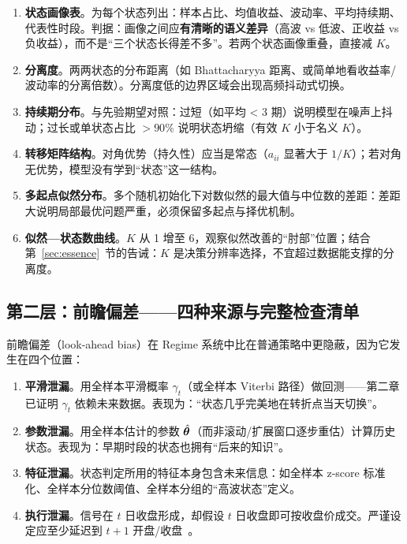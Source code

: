 \begin{enumerate}[itemsep=3pt]
\item \textbf{状态画像表}。为每个状态列出：样本占比、均值收益、波动率、平均持续期、代表性时段。判据：画像之间应\textbf{有清晰的语义差异}（高波 vs 低波、正收益 vs 负收益），而不是“三个状态长得差不多”。若两个状态画像重叠，直接减 $K$。
\item \textbf{分离度}。两两状态的分布距离（如 Bhattacharyya 距离、或简单地看收益率/波动率的分离倍数）。分离度低的边界区域会出现高频抖动式切换。
\item \textbf{持续期分布}。与先验期望对照：过短（如平均 < 3 期）说明模型在噪声上抖动；过长或单状态占比 $> 90\%$ 说明状态坍缩（有效 $K$ 小于名义 $K$）。
\item \textbf{转移矩阵结构}。对角优势（持久性）应当是常态（$a_{ii}$ 显著大于 $1/K$）；若对角无优势，模型没有学到“状态”这一结构。
\item \textbf{多起点似然分布}。多个随机初始化下对数似然的最大值与中位数的差距：差距大说明局部最优问题严重，必须保留多起点与择优机制。
\item \textbf{似然—状态数曲线}。$K$ 从 1 增至 6，观察似然改善的“肘部”位置；结合第~\ref{sec:essence}~节的告诫：$K$ 是决策分辨率选择，不宜超过数据能支撑的分离度。
\end{enumerate}

\subsection{第二层：前瞻偏差——四种来源与完整检查清单}

前瞻偏差（look-ahead bias）在 Regime 系统中比在普通策略中更隐蔽，因为它发生在四个位置：

\begin{enumerate}[itemsep=3pt]
\item \textbf{平滑泄漏}。用全样本平滑概率 $\gamma_t$（或全样本 Viterbi 路径）做回测——第二章已证明 $\gamma_t$ 依赖未来数据。表现为：“状态几乎完美地在转折点当天切换”。
\item \textbf{参数泄漏}。用全样本估计的参数 $\hat{\bm{\theta}}$（而非滚动/扩展窗口逐步重估）计算历史状态。表现为：早期时段的状态也拥有“后来的知识”。
\item \textbf{特征泄漏}。状态判定所用的特征本身包含未来信息：如全样本 z-score 标准化、全样本分位数阈值、全样本分组的“高波状态”定义。
\item \textbf{执行泄漏}。信号在 $t$ 日收盘形成，却假设 $t$ 日收盘即可按收盘价成交。严谨设定应至少延迟到 $t+1$ 开盘/收盘~\cite{shu2024a}。
\end{enumerate}

